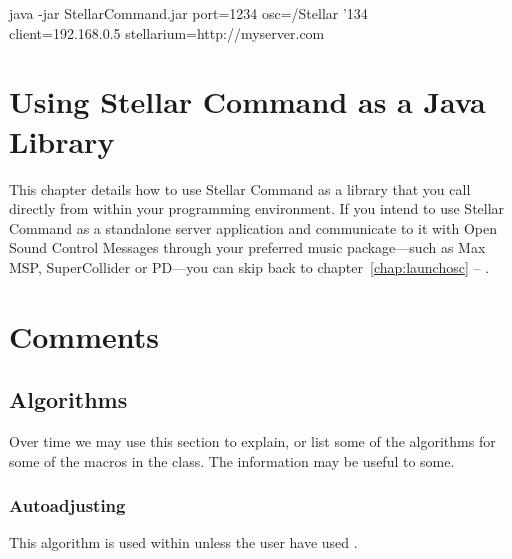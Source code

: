 \documentclass[10pt,a4paper,extrafontsizes]{memoir}
\begin{document}
   \begin{syntax}
	\medskip
	java -jar StellarCommand.jar port=1234 osc=/Stellar  {\char'134}\\client=192.168.0.5 stellarium=http://myserver.com\\
	\medskip
\end{syntax}
\bigskip

\clearpage
\pagestyle{ruled}



\chapter{Using Stellar Command as a Java Library} \label{chap:libraryosc}
This chapter details how to use Stellar Command as a library that you call directly from within your programming environment.
If you intend to use Stellar Command as a standalone server application and communicate to it with Open Sound Control Messages through your preferred music package---such as Max MSP, SuperCollider or PD---you can skip back to chapter~\ref{chap:launchosc} --
\emph{}.

    
\chapter{Comments}
\label{cha:comments}

\section{Algorithms}
\label{sec:algorithms}

Over time we may use this section to explain, or list some of the
algorithms for some of the macros in the class. The information may be
useful to some.

\subsection{Autoadjusting
  \texorpdfstring{}{\textbackslash marginparwidth}}
\label{sec:auto-csmarg}

This algorithm is used within \cmd{\fixthelayout} unless the user have
used \cmd{\setmarginnotes}.
\end{document}
